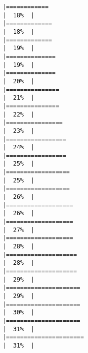 \documentclass[
]{article}
\begin{document}
\begin{verbatim}
|============                                                          |  18%  |                                                                              |=============                                                         |  18%  |                                                                              |=============                                                         |  19%  |                                                                              |==============                                                        |  19%  |                                                                              |==============                                                        |  20%  |                                                                              |===============                                                       |  21%  |                                                                              |===============                                                       |  22%  |                                                                              |================                                                      |  23%  |                                                                              |=================                                                     |  24%  |                                                                              |=================                                                     |  25%  |                                                                              |==================                                                    |  25%  |                                                                              |==================                                                    |  26%  |                                                                              |===================                                                   |  26%  |                                                                              |===================                                                   |  27%  |                                                                              |===================                                                   |  28%  |                                                                              |====================                                                  |  28%  |                                                                              |====================                                                  |  29%  |                                                                              |=====================                                                 |  29%  |                                                                              |=====================                                                 |  30%  |                                                                              |=====================                                                 |  31%  |                                                                              |======================                                                |  31%  |                                                                              
\end{verbatim}
\end{document}
